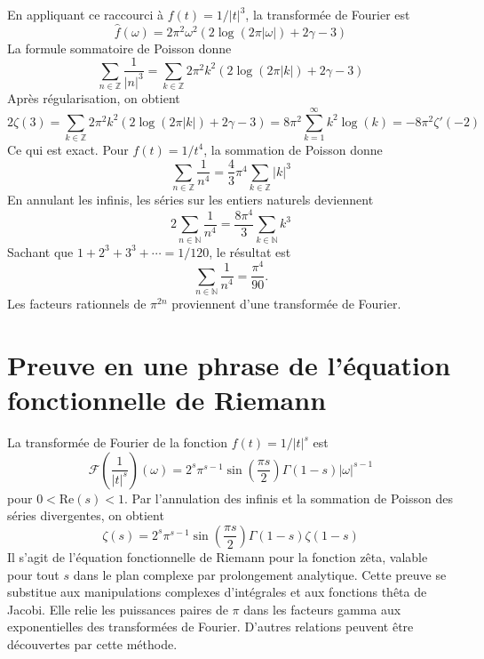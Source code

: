 \documentclass[12pt,a4paper]{article}
\begin{document}
En appliquant ce raccourci à $f(t) = 1/|t|^3$, la transformée de Fourier est
\[ \hat{f}(\omega) = 2\pi^2\omega^2(2\log(2\pi|\omega|) + 2\gamma - 3) \]
La formule sommatoire de Poisson donne
\[ \sum_{n\in\mathbb{Z}} \frac{1}{|n|^3} = \sum_{k\in\mathbb{Z}} 2\pi^2k^2(2\log(2\pi|k|) + 2\gamma - 3) \]
Après régularisation, on obtient
\[ 2\zeta(3) = \sum_{k\in\mathbb{Z}} 2\pi^2k^2(2\log(2\pi|k|) + 2\gamma - 3) = 8\pi^2\sum_{k=1}^{\infty} k^2\log(k) = -8\pi^2\zeta'(-2) \]
Ce qui est exact. Pour $f(t) = 1/t^4$, la sommation de Poisson donne
\[ \sum_{n\in\mathbb{Z}} \frac{1}{n^4} = \frac{4}{3}\pi^4\sum_{k\in\mathbb{Z}} |k|^3 \]
En annulant les infinis, les séries sur les entiers naturels deviennent
\[ 2\sum_{n\in\mathbb{N}} \frac{1}{n^4} = \frac{8\pi^4}{3}\sum_{k\in\mathbb{N}} k^3 \]
Sachant que $1+2^3+3^3+\cdots = 1/120$, le résultat est
\[ \sum_{n\in\mathbb{N}} \frac{1}{n^4} = \frac{\pi^4}{90}. \]
Les facteurs rationnels de $\pi^{2n}$ proviennent d'une transformée de Fourier.

\section*{Preuve en une phrase de l'équation fonctionnelle de Riemann}

La transformée de Fourier de la fonction $f(t) = 1/|t|^s$ est
\[ \mathcal{F}\left(\frac{1}{|t|^s}\right)(\omega) = 2^s\pi^{s-1}\sin\left(\frac{\pi s}{2}\right)\Gamma(1-s)|\omega|^{s-1} \]
pour $0 < \mathrm{Re}(s) < 1$. Par l'annulation des infinis et la sommation de Poisson des séries divergentes, on obtient
\[ \zeta(s) = 2^s\pi^{s-1}\sin\left(\frac{\pi s}{2}\right)\Gamma(1-s)\zeta(1-s) \]
Il s'agit de l'équation fonctionnelle de Riemann pour la fonction zêta, valable pour tout $s$ dans le plan complexe par prolongement analytique. Cette preuve se substitue aux manipulations complexes d'intégrales et aux fonctions thêta de Jacobi. Elle relie les puissances paires de $\pi$ dans les facteurs gamma aux exponentielles des transformées de Fourier. D'autres relations peuvent être découvertes par cette méthode.
\end{document}
